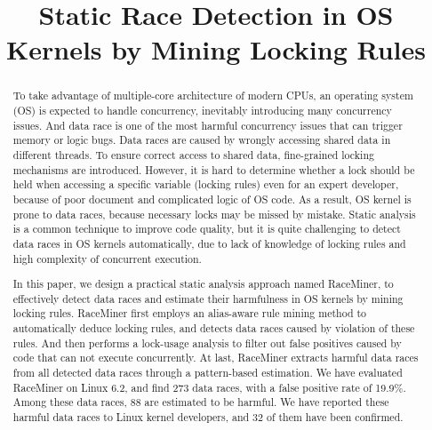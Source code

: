 \documentclass[pageno]{jpaper}
\newcommand{\sys}{\mbox{RaceMiner}\xspace}
\begin{document}
\title{
Static Race Detection in OS Kernels by Mining Locking Rules}

\date{}
\maketitle

\thispagestyle{empty}

\begin{abstract}
	
To take advantage of multiple-core architecture of modern CPUs, an operating 
system (OS) is expected to handle concurrency, inevitably introducing many 
concurrency issues. And data race is one of the most harmful concurrency issues 
that can trigger memory or logic bugs. Data races are caused by wrongly 
accessing shared data in different threads. To ensure correct access to shared 
data, fine-grained locking mechanisms are introduced. However, it is hard to 
determine whether a lock should be held when accessing a specific variable 
(locking rules) even for an expert developer, because of poor document and 
complicated logic of OS code. As a result, OS kernel is prone to data races, 
because necessary locks may be missed by mistake. Static analysis is a common 
technique to improve code quality, but it is quite challenging to detect data 
races in OS kernels automatically, due to lack of knowledge of locking rules 
and high complexity of concurrent execution.

In this paper, we design a practical static analysis approach named \sys, to 
effectively detect data races and estimate their harmfulness in OS kernels by 
mining locking rules. \sys first employs an alias-aware rule mining method to 
automatically deduce locking rules, and detects data races caused by violation 
of these rules. And then performs a lock-usage analysis to filter out false 
positives caused by code that can not execute concurrently. At last, \sys 
extracts harmful data races from all detected data races through a 
pattern-based estimation. We have evaluated \sys on Linux 6.2, and find 273 
data races, with a false positive rate of 19.9\%. Among these data races, 88 
are estimated to be harmful. We have reported these harmful data races to Linux 
kernel developers, and 32 of them have been confirmed.

\end{abstract}










\footnotesize


\end{document}

